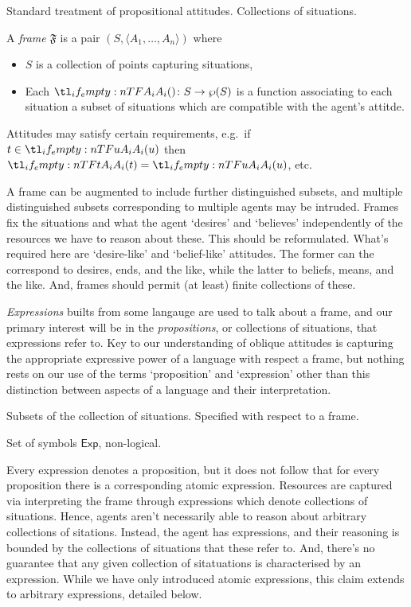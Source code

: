 \documentclass[10pt]{article}
\newcommand{\oframe}[1]{\ensuremath{\mathfrak{#1}}}
\begin{document}
Standard treatment of propositional attitudes.
Collections of situations.

\begin{definition}[Frame]
  A \emph{frame} \(\oframe{F}\) is a pair \((S,\langle A_{1},\dots,A_{n} \rangle)\) where
  \begin{itemize}
  \item \(S\) is a collection of points capturing situations,
  \item Each \(\fatt{} \colon S \to \wp(S)\) is a function associating to each situation a subset of situations which are compatible with the agent's attitde.
  \end{itemize}
  Attitudes may satisfy certain requirements, e.g.\ if \(t \in \fatt{u}\) then \(\fatt{t} = \fatt{u}\), etc.
\end{definition}
A frame can be augmented to include further distinguished subsets, and multiple distinguished subsets corresponding to multiple agents may be intruded.
Frames fix the situations and what the agent `desires' and `believes' independently of the resources we have to reason about these.
{\color{red} This should be reformulated.
  What's required here are `desire-like' and `belief-like' attitudes.
  The former can the correspond to desires, ends, and the like, while the latter to beliefs, means, and the like.
  And, frames should permit (at least) finite collections of these.}

\emph{Expressions} builts from some langauge are used to talk about a frame, and our primary interest will be in the \emph{propositions}, or collections of situations, that expressions refer to.
Key to our understanding of oblique attitudes is capturing the appropriate expressive power of a language with respect a frame, but nothing rests on our use of the terms `proposition' and `expression' other than this distinction between aspects of a language and their interpretation.

\begin{definition}[Propositions]
  Subsets of the collection of situations.
  Specified with respect to a frame.
\end{definition}

\begin{definition}
  Set of symbols \(\mathsf{Exp}\), non-logical.
\end{definition}

Every expression denotes a proposition, but it does not follow that for every proposition there is a corresponding atomic expression.
Resources are captured via interpreting the frame through expressions which denote collections of situations.
Hence, agents aren't necessarily able to reason about arbitrary collections of sitations.
Instead, the agent has expressions, and their reasoning is bounded by the collections of situations that these refer to.
And, there's no guarantee that any given collection of sitatuations is characterised by an expression.
While we have only introduced atomic expressions, this claim extends to arbitrary expressions, detailed below.
\end{document}
